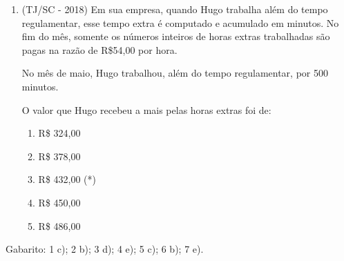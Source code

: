 \begin{enumerate}[1)]
 \item (TJ/SC - 2018) Em sua empresa, quando Hugo trabalha além do tempo regulamentar, esse tempo extra é computado e acumulado em minutos. No fim do mês, somente os números inteiros de horas extras trabalhadas são pagas na razão de R\$54,00 por hora.

  No mês de maio, Hugo trabalhou, além do tempo regulamentar, por 500 minutos.

  O valor que Hugo recebeu a mais pelas horas extras foi de:
  \begin{enumerate}
  \item R\$ 324,00
  \item R\$ 378,00
  \item R\$ 432,00 (*)
  \item R\$ 450,00
  \item R\$ 486,00
 \end{enumerate}

\end{enumerate}

Gabarito: 1 c); 2 b); 3 d); 4 e); 5 c); 6 b); 7 e).

